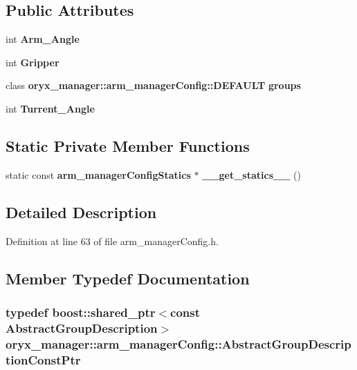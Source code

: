 \subsection*{\-Public \-Attributes}
\begin{DoxyCompactItemize}
\item 
int {\bf \-Arm\-\_\-\-Angle}
\item 
int {\bf \-Gripper}
\item 
class \*
{\bf oryx\-\_\-manager\-::arm\-\_\-manager\-Config\-::\-D\-E\-F\-A\-U\-L\-T} {\bf groups}
\item 
int {\bf \-Turrent\-\_\-\-Angle}
\end{DoxyCompactItemize}
\subsection*{\-Static \-Private \-Member \-Functions}
\begin{DoxyCompactItemize}
\item 
static const \*
{\bf arm\-\_\-manager\-Config\-Statics} $\ast$ {\bf \-\_\-\-\_\-get\-\_\-statics\-\_\-\-\_\-} ()
\end{DoxyCompactItemize}


\subsection{\-Detailed \-Description}


\-Definition at line 63 of file arm\-\_\-manager\-Config.\-h.



\subsection{\-Member \-Typedef \-Documentation}
\subsubsection[{\-Abstract\-Group\-Description\-Const\-Ptr}]{\setlength{\rightskip}{0pt plus 5cm}typedef boost\-::shared\-\_\-ptr$<$const {\bf \-Abstract\-Group\-Description}$>$ {\bf oryx\-\_\-manager\-::arm\-\_\-manager\-Config\-::\-Abstract\-Group\-Description\-Const\-Ptr}}\label{classoryx__manager_1_1arm__managerConfig_a88e26fcfd562749ce97cd48672ac2e82}


